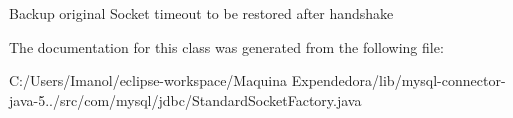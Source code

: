 Backup original Socket timeout to be restored after handshake 

The documentation for this class was generated from the following file\+:\begin{DoxyCompactItemize}
\item 
C\+:/\+Users/\+Imanol/eclipse-\/workspace/\+Maquina Expendedora/lib/mysql-\/connector-\/java-\/5../src/com/mysql/jdbc/Standard\+Socket\+Factory.\+java\end{DoxyCompactItemize}
